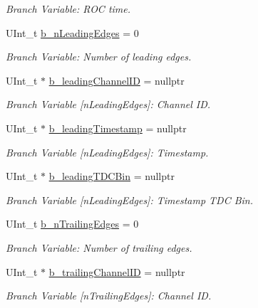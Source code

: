 \begin{DoxyCompactItemize}
\begin{DoxyCompactList}\small\item\em Branch Variable\+: R\+OC time. \end{DoxyCompactList}\item 
U\+Int\+\_\+t \hyperlink{class_packet_tree_manager_a146354471ea64dae67959dd833c100c2}{b\+\_\+n\+Leading\+Edges} = 0
\begin{DoxyCompactList}\small\item\em Branch Variable\+: Number of leading edges. \end{DoxyCompactList}\item 
U\+Int\+\_\+t $\ast$ \hyperlink{class_packet_tree_manager_a14090e7e05b84788ac03b36843edb926}{b\+\_\+leading\+Channel\+ID} = nullptr
\begin{DoxyCompactList}\small\item\em Branch Variable \mbox{[}n\+Leading\+Edges\mbox{]}\+: Channel ID. \end{DoxyCompactList}\item 
U\+Int\+\_\+t $\ast$ \hyperlink{class_packet_tree_manager_aaba5588ce24ffbbfaa7602f31856a438}{b\+\_\+leading\+Timestamp} = nullptr
\begin{DoxyCompactList}\small\item\em Branch Variable \mbox{[}n\+Leading\+Edges\mbox{]}\+: Timestamp. \end{DoxyCompactList}\item 
U\+Int\+\_\+t $\ast$ \hyperlink{class_packet_tree_manager_ae28ebfaf5833b8c5fa4fc264a50302dd}{b\+\_\+leading\+T\+D\+C\+Bin} = nullptr
\begin{DoxyCompactList}\small\item\em Branch Variable \mbox{[}n\+Leading\+Edges\mbox{]}\+: Timestamp T\+DC Bin. \end{DoxyCompactList}\item 
U\+Int\+\_\+t \hyperlink{class_packet_tree_manager_a64f60068f8f3d5d2531a61d11b877b85}{b\+\_\+n\+Trailing\+Edges} = 0
\begin{DoxyCompactList}\small\item\em Branch Variable\+: Number of trailing edges. \end{DoxyCompactList}\item 
U\+Int\+\_\+t $\ast$ \hyperlink{class_packet_tree_manager_ad8e33ea8a6cde82babd0a8a89225b4ae}{b\+\_\+trailing\+Channel\+ID} = nullptr
\begin{DoxyCompactList}\small\item\em Branch Variable \mbox{[}n\+Trailing\+Edges\mbox{]}\+: Channel ID. \end{DoxyCompactList}\item 

\end{DoxyCompactItemize}
